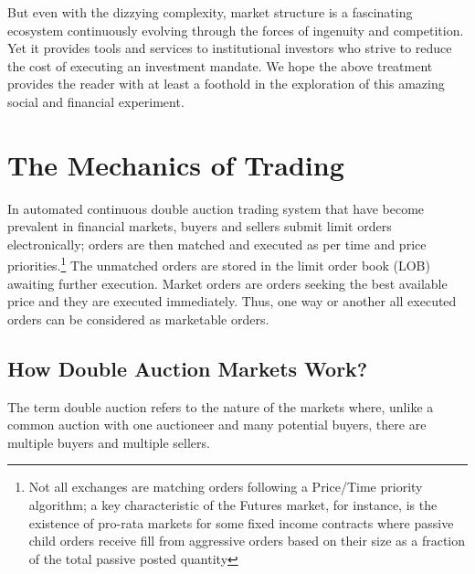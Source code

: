 But even with the dizzying complexity, market structure is a fascinating ecosystem continuously evolving through the forces of ingenuity and competition. Yet it provides tools and services to institutional investors who strive to reduce the cost of executing an investment mandate. We hope the above treatment provides the reader with at least a foothold in the exploration of this amazing social and financial experiment.



\section{The Mechanics of Trading}



In automated continuous double auction trading system that have become prevalent in financial markets, buyers and sellers submit limit orders electronically; orders are then matched and executed as per time and price priorities.\footnote{Not all exchanges are matching orders following a Price/Time priority algorithm; a key characteristic of the Futures market, for instance, is the existence of pro-rata markets for some fixed income contracts where passive child orders receive fill from aggressive orders based on their size as a fraction of the total passive posted quantity} The unmatched orders are stored in the limit order book (LOB) awaiting further execution. Market orders are orders seeking the best available price and they are executed immediately. Thus, one way or another all executed orders can be considered as marketable orders.




\subsection{How Double Auction Markets Work?}



The term double auction refers to the nature of the markets where, unlike a common auction with one auctioneer and many potential buyers, there are multiple buyers and multiple sellers. \\



